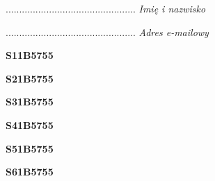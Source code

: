 \begin{turn}{90}\begin{minipage}{\linewidth} \vspace{20mm} ................................................  \textit{Imię i nazwisko}\end{minipage}\end{turn}

\begin{turn}{90}\begin{minipage}{\linewidth} \vspace{20mm} ................................................  \textit{Adres e-mailowy}\end{minipage}\end{turn}

\begin{turn}{90}\huge \begin{minipage}{\linewidth} \vspace{10mm}\textbf{S11B5755}\end{minipage}\end{turn}

\begin{turn}{90}\huge \begin{minipage}{\linewidth} \vspace{10mm}\textbf{S21B5755}\end{minipage}\end{turn}

\begin{turn}{90}\huge \begin{minipage}{\linewidth} \vspace{10mm}\textbf{S31B5755}\end{minipage}\end{turn}

\begin{turn}{90}\huge \begin{minipage}{\linewidth} \vspace{10mm}\textbf{S41B5755}\end{minipage}\end{turn}

\begin{turn}{90}\huge \begin{minipage}{\linewidth} \vspace{10mm}\textbf{S51B5755}\end{minipage}\end{turn}

\begin{turn}{90}\huge \begin{minipage}{\linewidth} \vspace{10mm}\textbf{S61B5755}\end{minipage}\end{turn}

